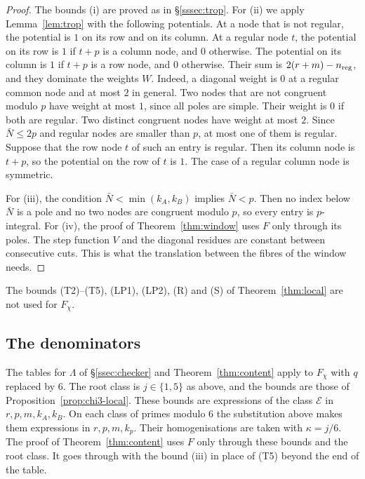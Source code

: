 \documentclass[11pt]{amsart}
\theoremstyle{definition}
\theoremstyle{remark}
\numberwithin{equation}{section}
\begin{document}
\begin{proof}
The bounds (i) are proved as in \S\ref{sssec:trop}. For (ii) we apply Lemma~\ref{lem:trop} with the following potentials.
At a node that is not regular, the potential is $1$ on its row and on its column. At a regular node $t$, the potential on
its row is $1$ if $t+p$ is a column node, and $0$ otherwise. The potential on its column is $1$ if $t+p$ is a row node,
and $0$ otherwise. Their sum is $2(r+m)-n_{\rm reg}$, and they dominate the weights $W$. Indeed, a diagonal weight is $0$
at a regular common node and at most $2$ in general. Two nodes that are not congruent modulo $p$ have weight at most $1$,
since all poles are simple. Their weight is $0$ if both are regular. Two distinct congruent nodes have weight at most
$2$. Since $\bar N\le2p$ and regular nodes are smaller than $p$, at most one of them is regular. Suppose that the row node $t$
of such an entry is regular. Then its column node is $t+p$, so the potential on the row of $t$ is $1$. The case of a
regular column node is symmetric.

For (iii), the condition $\bar N<\min(k_A,k_B)$ implies $\bar N<p$. Then no index below $\bar N$ is a pole and no two nodes are
congruent modulo $p$, so every entry is $p$-integral. For (iv), the proof of Theorem~\ref{thm:window} uses $F$ only
through its poles. The step function $V$ and the diagonal residues are constant between consecutive cuts. This is what
the translation between the fibres of the window needs.
\end{proof}

The bounds (T2)--(T5), (LP1), (LP2), (R) and (S) of Theorem~\ref{thm:local} are not used for $F_\chi$.

\subsection{The denominators}
The tables for $\Lambda$ of \S\ref{ssec:checker} and Theorem~\ref{thm:content} apply to $F_\chi$ with $q$ replaced by $6$. The root
class is $j\in\{1,5\}$ as above, and the bounds are those of Proposition~\ref{prop:chi3-local}. These bounds are
expressions of the class $\mathcal E$ in $r,p,m,k_A,k_B$. On each class of primes modulo $6$ the substitution above makes
them expressions in $r,p,m,k_p$. Their homogenisations are taken with $\kappa=j/6$. The proof of
Theorem~\ref{thm:content} uses $F$ only through these bounds and the root class. It goes through with the bound
(iii) in place of (T5) beyond the end of the table.
\end{document}
